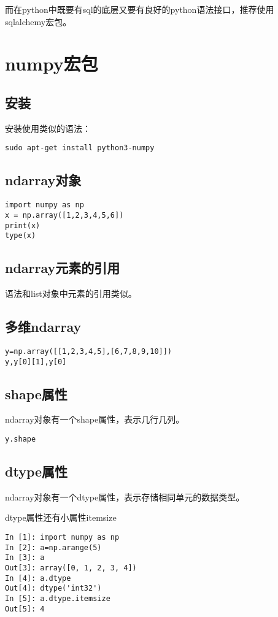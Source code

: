 \documentclass[12pt,oneside]{book}
\begin{document}
\begin{common-format}
而在python中既要有sql的底层又要有良好的python语法接口，推荐使用sqlalchemy宏包。



\chapter{numpy宏包}
\section{安装}
安装使用类似的语法：
\begin{Verbatim}
sudo apt-get install python3-numpy
\end{Verbatim}



\section{ndarray对象}
\begin{Verbatim}
import numpy as np
x = np.array([1,2,3,4,5,6])
print(x)
type(x)
\end{Verbatim}


\section{ndarray元素的引用}
语法和list对象中元素的引用类似。


\section{多维ndarray}
\begin{Verbatim}
y=np.array([[1,2,3,4,5],[6,7,8,9,10]])
y,y[0][1],y[0]
\end{Verbatim}


\section{shape属性}
ndarray对象有一个shape属性，表示几行几列。
\begin{Verbatim}
y.shape
\end{Verbatim}

\section{dtype属性}
ndarray对象有一个dtype属性，表示存储相同单元的数据类型。

dtype属性还有小属性itemsize
\begin{Verbatim}
In [1]: import numpy as np
In [2]: a=np.arange(5)
In [3]: a
Out[3]: array([0, 1, 2, 3, 4])
In [4]: a.dtype
Out[4]: dtype('int32')
In [5]: a.dtype.itemsize
Out[5]: 4
\end{Verbatim}





\end{common-format}
\end{document}
